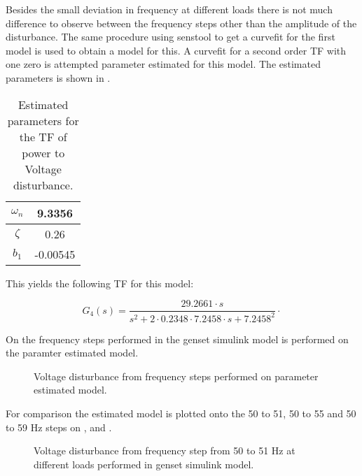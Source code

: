 Besides the small deviation in frequency at different loads there is not much difference to observe between the frequency steps other than the amplitude of the disturbance. The same procedure using senstool to get a curvefit for the first model is used to obtain a model for this. A curvefit for a second order TF with one zero is attempted parameter estimated for this model. The estimated parameters is shown in .

\begin{table}[H]
\centering
\begin{tabular}{|c|c|}
\hline
$\omega_n$ & 9.3356 \\ \hline
$\zeta$  & 0.26 \\ \hline
$b_1$       & -0.00545    \\ \hline
\end{tabular}
\caption{Estimated parameters for the TF of power to Voltage disturbance.}
\label{tab:freqvoltdisturbparam}
\end{table}  

This yields the following TF for this model:

\begin{equation}
\label{eq:tf4_one_zeros}
G_4(s) = \frac {29.2661 \cdot s}{s^2+2\cdot 0.2348 \cdot 7.2458 \cdot s + 7.2458^2} \unit{\cdot}
\end{equation} 

On  the frequency steps performed in the genset simulink model is performed on the paramter estimated model.

\begin{figure}[H]
\centering

\caption{Voltage disturbance from frequency steps performed on parameter estimated model.}
\label{fig:modelfreq_volt}
\end{figure}

For comparison the estimated model is plotted onto the 50 to 51, 50 to 55 and 50 to 59 Hz steps on ,  and .

\begin{figure}[H]
\centering

\caption{Voltage disturbance from frequency step from 50 to 51 Hz at different loads performed in genset simulink model.}
\label{fig:freq5051_103050kwmodel_volt}
\end{figure}

